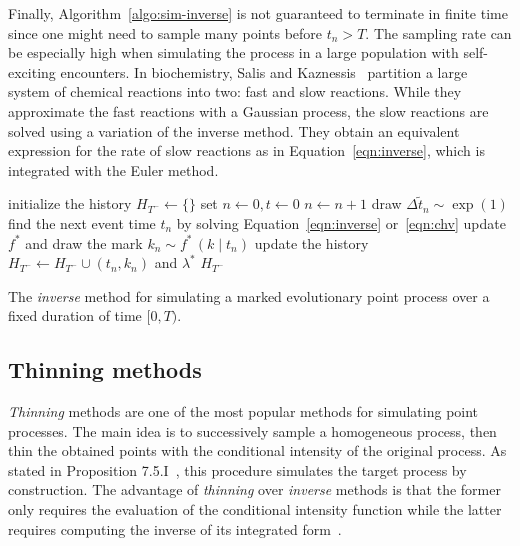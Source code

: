 \documentclass{juliacon}
\numberwithin{equation}{section}
\begin{document}
Finally, Algorithm~\ref{algo:sim-inverse} is not guaranteed to terminate in finite time since one might need to sample many points before \( t_n > T \). The sampling rate can be especially high when simulating the process in a large population with self-exciting encounters. In biochemistry, Salis and Kaznessis~\cite{salis2005} partition a large system of chemical reactions into two: fast and slow reactions. While they approximate the fast reactions with a Gaussian process, the slow reactions are solved using a variation of the inverse method. They obtain an equivalent expression for the rate of slow reactions as in Equation~\ref{eqn:inverse}, which is integrated with the Euler method.

\begin{algorithm}[h]
\begin{algorithmic}[1]
  \Procedure{InverseMethod}{\( [0, T) \), \( \lambda^\ast \), \( f^\ast \),}
    \State initialize the history \( H_{T^-} \leftarrow \{ \} \)
    \State set \( n \leftarrow 0, t \leftarrow  0 \)
      \State \( n \leftarrow n + 1 \)
      \State draw \( \Delta \tilde{t}_n \sim \exp(1) \)
      \State find the next event time \( t_n \) by solving Equation~\ref{eqn:inverse} or~\ref{eqn:chv}
      \State update \( f^\ast \) and draw the mark \( k_n \sim f^\ast \, (k \mid t_n) \) \label{line:inverse-mark-sample}
      \State update the history \( H_{T^-} \leftarrow H_{T^-} \cup (t_n, k_n) \) and \( \lambda^\ast \) \label{line:inverse-history-update}
    \EndWhile
    \State \Return \( H_{T^-} \)
  \EndProcedure
\end{algorithmic}
\caption{The \textit{inverse} method for simulating a marked evolutionary point process over a fixed duration of time \( [0, T) \).}
\label{algo:sim-inverse}
\end{algorithm}

\subsection{Thinning methods} \label{subsec:sim-thinning}

\textit{Thinning} methods are one of the most popular methods for simulating point processes. The main idea is to successively sample a homogeneous process, then thin the obtained points with the conditional intensity of the original process. As stated in Proposition 7.5.I~\cite{daley2003}, this procedure simulates the target process by construction. The advantage of \textit{thinning} over \textit{inverse} methods is that the former only requires the evaluation of the conditional intensity function while the latter requires computing the inverse of its integrated form~\cite{daley2003}.
\end{document}
